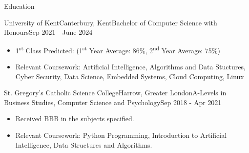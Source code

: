 \documentclass[11pt]{article}
\newlength{\secsep}
\newlength{\seperate}
\newcommand{\coloredhrulefill}[2][black]{%
    \leavevmode%
    \leaders\hbox{\textcolor{#1}{\rule{1ex}{0.5pt}}}\hfill\kern0pt%
}
\newcommand{\lineunder}{\vspace*{-8pt} \hspace*{-6pt} \coloredhrulefill[contactgrey]{}  \\* \vspace*{-8pt}}
\newenvironment{tabbedList}[1]{
	\begin{list}{}{
      \setlength{\itemsep}{0pt}
      \setlength{\labelsep}{0pt}
      \setlength{\labelwidth}{0pt}
      \setlength{\leftmargin}{0pt}
      \setlength{\rightmargin}{0pt}
      \setlength{\listparindent}{0pt}
      \setlength{\parsep}{0pt}
      \setlength{\parskip}{0pt}
      \setlength{\partopsep}{0pt}
      \setlength{\topsep}{#1}
	}
	\item[]
}{\end{list}}
\newenvironment{resume_section}[1] {
	\filbreak
	\vspace{1\secsep}
	\textsc{\Large\textcolor{darkblue}{#1}} \lineunder \vspace*{0.5\secsep}
	\begin{tabbedList}{\secsep}
}{\end{tabbedList}}
\newenvironment{resume_subsection}[4] {
	\textbf{#1} \hfill {\footnotesize \textcolor{darkblue}{#2}}\vspace*{-1px}\\*  %
	{\small#3} \hfill {\footnotesize \textit{\color{contactgrey}{#4}}}\vspace*{1px}
	
	\begin{tabbedList}{0pt}
}{\end{tabbedList}\vspace*{0.8\secsep}}
\newenvironment{subitems}{
	\vspace*{-2px}
	\renewcommand{\labelitemi}{\color{contactgrey}{\faCode}}
	\begin{itemize}
		\setlength{\labelsep}{0.3em}
		\setlength{\itemsep}{0pt}
		\setlength{\parsep}{0pt}
		\setlength{\topsep}{0px}
}{\end{itemize}}
\begin{document}
	\begin{resume_section}{Education}
		\begin{resume_subsection}{University of Kent}{Canterbury, Kent}{Bachelor of Computer Science with Honours}{Sep 2021 - June 2024}
			\begin{subitems}
				\item 1\textsuperscript{st} Class Predicted: (1\textsuperscript{st} Year Average: 86\%, 2\textsuperscript{nd} Year Average: 75\%)
				\item Relevant Coursework: Artificial Intelligence, Algorithms and Data Stuctures, Cyber Security, Data Science, Embedded Systems, Cloud Computing, Linux
			\end{subitems}
		\end{resume_subsection}
		
		\vspace*{\seperate}
		
		\begin{resume_subsection}{St. Gregory's Catholic Science College}{Harrow, Greater London}{A-Levels in Business Studies, Computer Science and Psychology}{Sep 2018 - Apr 2021}
			\begin{subitems}
				\item Received BBB in the subjects specified.
				\item Relevant Coursework: Python Programming, Introduction to Artificial Intelligence, Data Structures and Algorithms.
			\end{subitems}
		\end{resume_subsection}
	\end{resume_section}
	
\end{document}
